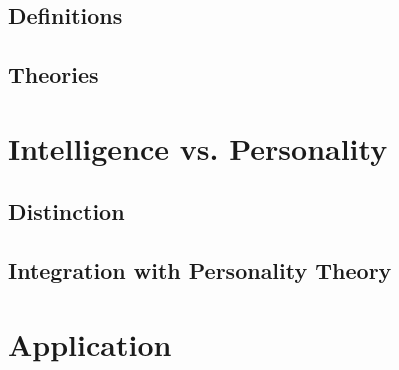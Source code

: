 \documentclass[xcolor=x11names,compress]{beamer}\usepackage[]{graphicx}\usepackage[]{color}
\renewcommand{\(}{\begin{columns}}
\renewcommand{\)}{\end{columns}}
\newcommand{\<}[1]{\begin{column}{#1}}
\renewcommand{\>}{\end{column}}
\begin{document}






\subsection{Definitions}


\subsection{Theories}



\section{Intelligence vs. Personality}
\subsection{Distinction}



\subsection{Integration with Personality Theory}


\section{Application}
\end{document}
